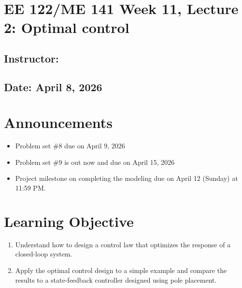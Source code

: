 \documentclass{ee122_notes}
\renewcommand{\releasedate}{April 8, 2026}
\begin{document}
\section*{EE 122/ME 141 Week 11, Lecture 2: Optimal control}
\subsection*{Instructor: \instructor}
\subsection*{Date: \releasedate}
\section{Announcements}
\begin{itemize}
    \item Problem set \#8 due on April 9, 2026 
    \item Problem set \#9 is out now and due on April 15, 2026
    \item Project milestone on completing the modeling due on April 12 (Sunday) at 11:59 PM.
\end{itemize}
\section{Learning Objective}
\begin{enumerate}
    \item Understand how to design a control law that optimizes the response of a closed-loop system.
    \item Apply the optimal control design to a simple example and compare the results to a state-feedback controller designed using pole placement.
\end{enumerate} 
\end{document}
